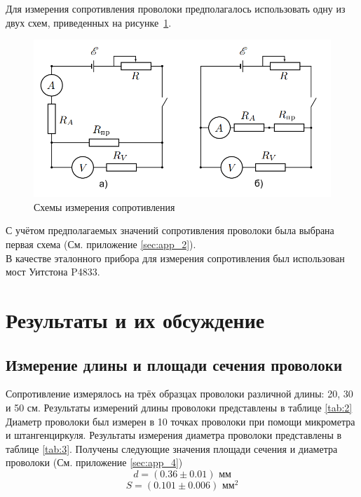 \documentclass{article}
\begin{document}
Для измерения сопротивления проволоки предполагалось использовать одну из двух схем, 
приведенных на рисунке~\ref{fig:1}.
\begin{figure}[H]
    \begin{center}
        \includegraphics[width=\textwidth]{curcuits}
    \end{center}
    \caption{Схемы измерения сопротивления}
    \label{fig:1}
\end{figure}
С учётом предполагаемых значений сопротивления проволоки была выбрана первая схема (См. приложение \ref{sec:app_2}). \\
В качестве эталонного прибора для измерения сопротивления был использован мост Уитстона P4833.

\section{Результаты и их обсуждение}
\subsection{Измерение длины и площади сечения проволоки}
Сопротивление измерялось на трёх образцах проволоки различной длины: 20, 30 и 50 см.
Результаты измерений длины проволоки представлены в таблице \ref{tab:2}\\
Диаметр проволоки был измерен в 10 точках проволоки при помощи микрометра и штангенциркуля. 
Результаты измерения диаметра проволоки представлены в таблице \ref{tab:3}.
Получены следующие значения площади сечения и диаметра проволоки (См. приложение \ref{sec:app_4})
\begin{equation}
    d = (0.36 \pm 0.01) \textrm{ мм}
\end{equation}
\begin{equation}
    S = (0.101\pm0.006)\textrm{ мм}^2
\end{equation}
\end{document}

